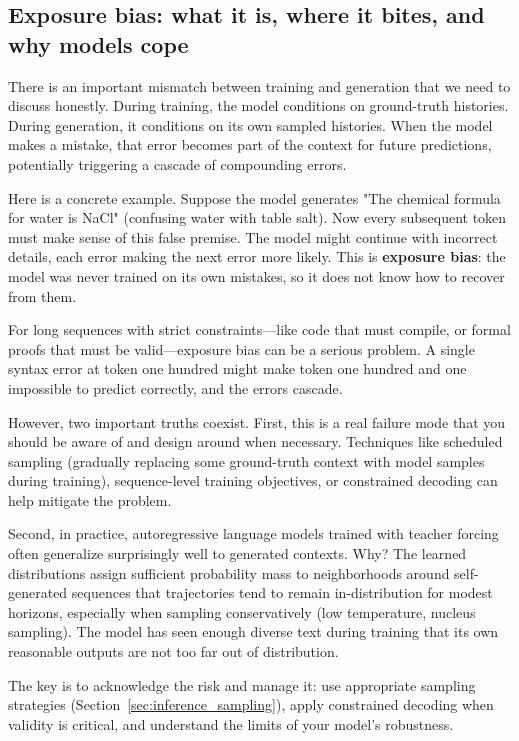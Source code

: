 \vspace{0.6em}

\subsection{Exposure bias: what it is, where it bites, and why models cope}
\label{sec:exposure_bias}

There is an important mismatch between training and generation that we need to discuss honestly. During training, the model conditions on ground-truth histories. During generation, it conditions on its own sampled histories. When the model makes a mistake, that error becomes part of the context for future predictions, potentially triggering a cascade of compounding errors.

Here is a concrete example. Suppose the model generates "The chemical formula for water is NaCl" (confusing water with table salt). Now every subsequent token must make sense of this false premise. The model might continue with incorrect details, each error making the next error more likely. This is \textbf{exposure bias}: the model was never trained on its own mistakes, so it does not know how to recover from them.

For long sequences with strict constraints---like code that must compile, or formal proofs that must be valid---exposure bias can be a serious problem. A single syntax error at token one hundred might make token one hundred and one impossible to predict correctly, and the errors cascade.

However, two important truths coexist. First, this is a real failure mode that you should be aware of and design around when necessary. Techniques like scheduled sampling (gradually replacing some ground-truth context with model samples during training), sequence-level training objectives, or constrained decoding can help mitigate the problem.

Second, in practice, autoregressive language models trained with teacher forcing often generalize surprisingly well to generated contexts. Why? The learned distributions assign sufficient probability mass to neighborhoods around self-generated sequences that trajectories tend to remain in-distribution for modest horizons, especially when sampling conservatively (low temperature, nucleus sampling). The model has seen enough diverse text during training that its own reasonable outputs are not too far out of distribution.

The key is to acknowledge the risk and manage it: use appropriate sampling strategies (Section~\ref{sec:inference_sampling}), apply constrained decoding when validity is critical, and understand the limits of your model's robustness.

